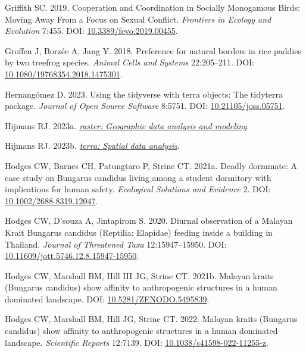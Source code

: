 \documentclass[10pt,a4paper]{article}
\newlength{\cslhangindent}
\newenvironment{CSLReferences}[2] %
 {\begin{list}{}{%
  \setlength{\itemindent}{0pt}
  \setlength{\leftmargin}{0pt}
  \setlength{\parsep}{0pt}
  \ifodd #1
   \setlength{\leftmargin}{\cslhangindent}
   \setlength{\itemindent}{-1\cslhangindent}
  \fi
  \setlength{\itemsep}{#2\baselineskip}}}
 {\end{list}}
\begin{document}
\begin{CSLReferences}{1}{0}
Griffith SC. 2019. Cooperation and {Coordination} in {Socially} {Monogamous} {Birds}: {Moving} {Away} {From} a {Focus} on {Sexual} {Conflict}. \emph{Frontiers in Ecology and Evolution} 7:455. DOI: \href{https://doi.org/10.3389/fevo.2019.00455}{10.3389/fevo.2019.00455}.

Groffen J, Borzée A, Jang Y. 2018. Preference for natural borders in rice paddies by two treefrog species. \emph{Animal Cells and Systems} 22:205--211. DOI: \href{https://doi.org/10.1080/19768354.2018.1475301}{10.1080/19768354.2018.1475301}.

Hernangómez D. 2023. Using the {tidyverse} with {terra} objects: The {tidyterra} package. \emph{Journal of Open Source Software} 8:5751. DOI: \href{https://doi.org/10.21105/joss.05751}{10.21105/joss.05751}.

Hijmans RJ. 2023a. \emph{\href{https://CRAN.R-project.org/package=raster}{{raster}: Geographic data analysis and modeling}}.

Hijmans RJ. 2023b. \emph{\href{https://CRAN.R-project.org/package=terra}{{terra}: Spatial data analysis}}.

Hodges CW, Barnes CH, Patungtaro P, Strine CT. 2021a. Deadly dormmate: {A} case study on {Bungarus} {candidus} living among a student dormitory with implications for human safety. \emph{Ecological Solutions and Evidence} 2. DOI: \href{https://doi.org/10.1002/2688-8319.12047}{10.1002/2688-8319.12047}.

Hodges CW, D'souza A, Jintapirom S. 2020. Diurnal observation of a {Malayan} {Krait} {Bungarus} candidus ({Reptilia}: {Elapidae}) feeding inside a building in {Thailand}. \emph{Journal of Threatened Taxa} 12:15947--15950. DOI: \href{https://doi.org/10.11609/jott.5746.12.8.15947-15950}{10.11609/jott.5746.12.8.15947-15950}.

Hodges CW, Marshall BM, Hill III JG, Strine CT. 2021b. Malayan kraits ({Bungarus} candidus) show affinity to anthropogenic structures in a human dominated landscape. DOI: \href{https://doi.org/10.5281/ZENODO.5495839}{10.5281/ZENODO.5495839}.

Hodges CW, Marshall BM, Hill JG, Strine CT. 2022. Malayan kraits ({Bungarus} candidus) show affinity to anthropogenic structures in a human dominated landscape. \emph{Scientific Reports} 12:7139. DOI: \href{https://doi.org/10.1038/s41598-022-11255-z}{10.1038/s41598-022-11255-z}.


\end{CSLReferences}
\end{document}
